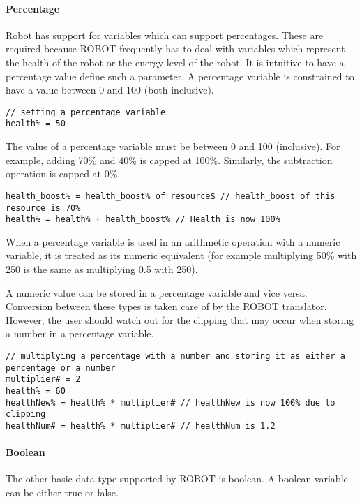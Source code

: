 \documentclass[a4paper]{article}
\begin{document}
\paragraph{Percentage}

Robot has support for variables which can support percentages. These are required because ROBOT frequently has to deal with variables which represent the health of the robot or the energy level of the robot. It is intuitive to have a percentage value define such a parameter. A percentage variable is constrained to have a value between 0 and 100 (both inclusive).

\begin{verbatim}
// setting a percentage variable
health% = 50
\end{verbatim}

The value of a percentage variable must be between 0 and 100 (inclusive).   For example, adding 70\% and 40\% is capped at 100\%.  Similarly, the subtraction operation is capped at 0\%.

\begin{verbatim}
health_boost% = health_boost% of resource$ // health_boost of this resource is 70%
health% = health% + health_boost% // Health is now 100%
\end{verbatim}

When a percentage variable is used in an arithmetic operation with a numeric variable, it is treated as its numeric equivalent (for example multiplying 50\% with 250 is the same as multiplying 0.5 with 250).

A numeric value can be stored in a percentage variable and vice versa.   Conversion between these types is taken care of by the ROBOT translator.  However, the user should watch out for the clipping that may occur when storing a number in a percentage variable.

\begin{verbatim}
// multiplying a percentage with a number and storing it as either a percentage or a number
multiplier# = 2
health% = 60
healthNew% = health% * multiplier# // healthNew is now 100% due to clipping
healthNum# = health% * multiplier# // healthNum is 1.2
\end{verbatim}

\paragraph{Boolean}
The other basic data type supported by ROBOT is boolean. A boolean variable can be either true or false.
\end{document}
